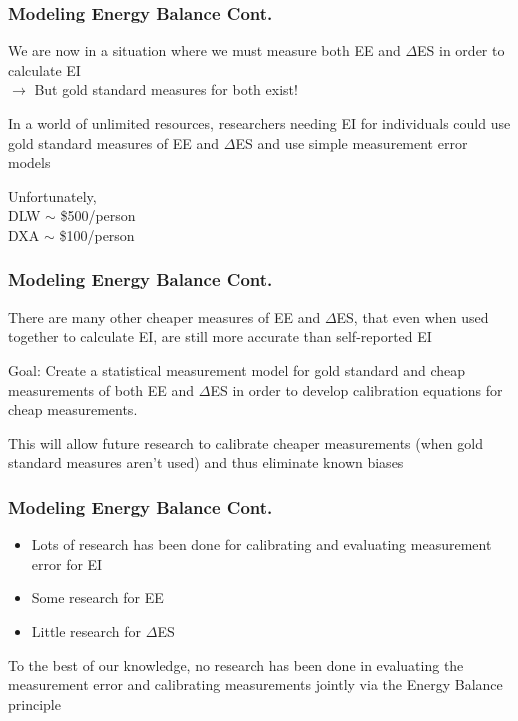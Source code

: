\documentclass[handout]{beamer}\usepackage[]{graphicx}\usepackage[]{color}
\begin{document}
\begin{frame}
\frametitle{Modeling Energy Balance Cont.}
We are now in a situation where we must measure both EE and $\Delta$ES in order to calculate EI \\
$\rightarrow$ But gold standard measures for both exist!

\vspace{0.3cm}

In a world of unlimited resources, researchers needing EI for individuals could use gold standard measures of EE and $\Delta$ES and use simple measurement error models\\

\vspace{0.3cm}

Unfortunately,\\
DLW $\sim$ \$500/person \\
DXA $\sim$ \$100/person

\end{frame}

\begin{frame}
\frametitle{Modeling Energy Balance Cont.}
There are many other cheaper measures of EE and $\Delta$ES, that even when used together to calculate EI, are still more accurate than self-reported EI \\

\vspace{0.4cm}

Goal: Create a statistical measurement model for gold standard and cheap measurements of both EE and $\Delta$ES in order to develop calibration equations for cheap measurements.\\

\vspace{0.4cm}

This will allow future research to calibrate cheaper measurements (when gold standard measures aren't used) and thus eliminate known biases

\end{frame}

\begin{frame}
\frametitle{Modeling Energy Balance Cont. }

\begin{itemize}
\item
Lots of research has been done for calibrating and evaluating measurement error for EI
\item
Some research for EE
\item
Little research for $\Delta$ES
\end{itemize}

\vspace{0.2cm}

To the best of our knowledge, no research has been done in evaluating the measurement error and calibrating measurements jointly via the Energy Balance principle


\end{frame}
\end{document}
